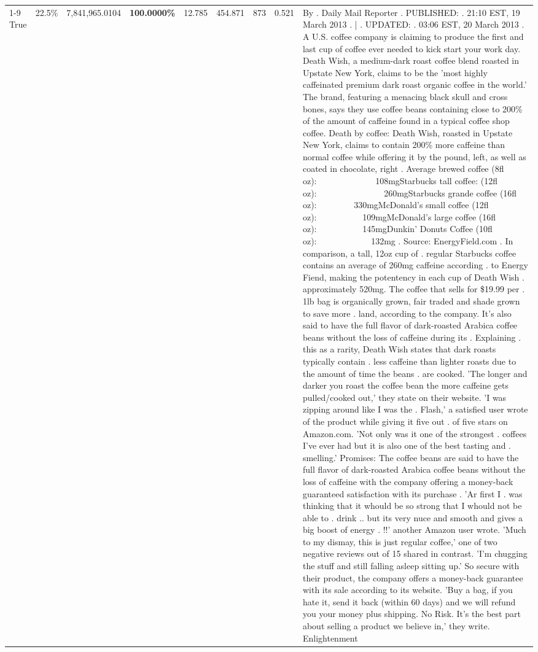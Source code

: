 \begin{table}[H]
{\begin{tabular}{lllrlllll}
\cline{1-9}
True & 22.5\% & 7,841,965.0104 & \bfseries \color{red} 100.0000\% & 12.785 & 454.871 & 873 & 0.521 & By . Daily Mail Reporter . PUBLISHED: . 21:10 EST, 19 March 2013 . | . UPDATED: . 03:06 EST, 20 March 2013 . A U.S. coffee company is claiming to produce the first and last cup of coffee ever needed to kick start your work day. Death Wish, a medium-dark roast coffee blend roasted in Upstate New York, claims to be the 'most highly caffeinated premium dark roast organic coffee in the world.' The brand, featuring a menacing black skull and cross bones, says they use coffee beans containing close to 200\% of the amount of caffeine found in a typical coffee shop coffee. Death by coffee: Death Wish, roasted in Upstate New York, claims to contain 200\% more caffeine than normal coffee while offering it by the pound, left, as well as coated in chocolate, right . Average brewed coffee (8fl oz):              108mgStarbucks tall coffee: (12fl oz):                260mgStarbucks grande coffee (16fl oz):         330mgMcDonald's small coffee (12fl oz):           109mgMcDonald's large coffee (16fl oz):           145mgDunkin' Donuts Coffee (10fl oz):             132mg . Source: EnergyField.com . In comparison, a tall, 12oz cup of . regular Starbucks coffee contains an average of 260mg caffeine according . to Energy Fiend, making the potentency in each cup of Death Wish . approximately 520mg. The coffee that sells for \$19.99 per . 1lb bag is organically grown, fair traded and shade grown to save more . land, according to the company. It's also said to have the full flavor of dark-roasted Arabica coffee beans without the loss of caffeine during its . Explaining . this as a rarity, Death Wish states that dark roasts typically contain . less caffeine than lighter roasts due to the amount of time the beans . are cooked. 'The longer and darker you roast the coffee bean the more caffeine gets pulled/cooked out,' they state on their website. 'I was zipping around like I was the . Flash,' a satisfied user wrote of the product while giving it five out . of five stars on Amazon.com. 'Not only was it one of the strongest . coffees I've ever had but it is also one of the best tasting and . smelling.’ Promises: The coffee beans are said to have the full flavor of dark-roasted Arabica coffee beans without the loss of caffeine with the company offering a money-back guaranteed satisfaction with its purchase . 'Ar first I . was thinking that it whould be so strong that I whould not be able to . drink .. but its very nuce and smooth and gives a big boost of energy . !!' another Amazon user wrote. 'Much to my dismay, this is just regular coffee,' one of two negative reviews out of 15 shared in contrast. 'I'm chugging the stuff and still falling asleep sitting up.' So secure with their product, the company offers a money-back guarantee with its sale according to its website. 'Buy a bag, if you hate it, send it back (within 60 days) and we will refund you your money plus shipping. No Risk. It’s the best part about selling a product we believe in,' they write. Enlightenment \\

\end{tabular}}
\end{table}
